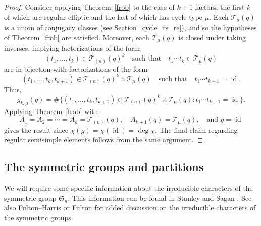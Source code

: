 \documentclass[Unicode,ALCO]{cedram}
\DeclareMathOperator{\id}{id}
\newcommand{\FS}{\mathfrak{S}}
\newcommand{\CT}{\mathcal{T}}
\begin{document}
\begin{proof}
Consider applying Theorem~\ref{frob} to the case of \(k+1\) factors, the first \(k\) of which are regular elliptic and the last of which has cycle type \(\mu\).
Each \(\CT_\mu (q)\) is a union of conjugacy classes (see Section~\ref{cycle_rs_re}), and so the hypotheses of Theorem~\ref{frob} are satisfied.
Moreover, each \(\CT_\mu (q)\) is closed under taking inverses, implying factorizations of the form
\[
(t_1,\ldots,t_k) \in \CT_{(n)}(q)^k
\quad
\text{such that}
\quad
t_1 \cdots t_k \in \CT_\mu (q)
\]
are in bijection with factorizations of the form
\[
(t_1,\ldots,t_k,t_{k+1}) \in \CT_{(n)}(q)^k \times \CT_\mu (q)
\quad
\text{such that}
\quad
t_1 \cdots t_{k+1} = \id.
\]
Thus,
\[
g_{k,\mu} (q)
=
\# \{ (t_1,\ldots,t_k,t_{k+1}) \in \CT_{(n)} (q)^k \times \CT_\mu (q) : t_1 \cdots t_{k+1} = \id \}.
\]
Applying Theorem~\ref{frob} with
\[
A_1 = A_2 = \cdots = A_k = \CT_{(n)}(q), \quad A_{k+1} (q) = \CT_\mu (q), \quad \text{and } g = \id
\]
gives the result
since \(\chi(g) = \chi(\id) = \deg \chi\).
The final claim regarding regular semisimple elements follows from the same argument.
\end{proof}


































\subsection{The symmetric groups and partitions}

We will require some specific information about the irreducible characters of the symmetric group \(\FS_n\).
This information can be found in Stanley \cite{EC2} and Sagan \cite{sagan}. See also Fulton--Harris \cite{FH} or Fulton \cite{fulton} for added discussion on the irreducible characters of the symmetric groups.
\end{document}

